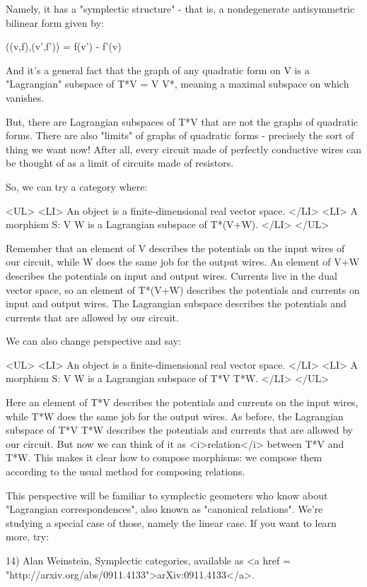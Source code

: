 Namely, it has a "symplectic structure" - that is, a nondegenerate
antisymmetric bilinear form \omega  given by:

\omega ((v,f),(v',f')) = f(v') - f'(v)

And it's a general fact that the graph of any quadratic form on V is a
"Lagrangian" subspace of T*V = V \times  V*, meaning a
maximal subspace on which \omega  vanishes.

But, there are Lagrangian subspaces of T*V that are not the graphs of
quadratic forms.  There are also "limits" of graphs of quadratic
forms - precisely the sort of thing we want now!  After all, every
circuit made of perfectly conductive wires can be thought of as a 
limit of circuits made of resistors.

So, we can try a category where:

<UL>
<LI>
  An object is a finite-dimensional real vector space.  
</LI>
<LI>
  A morphism S: V \to  W is a Lagrangian subspace of T*(V+W).
</LI>
</UL>

Remember that an element of V describes the potentials on the input
wires of our circuit, while W does the same job for the output wires.
An element of V+W describes the potentials on input and output wires.
Currents live in the dual vector space, so an element of T*(V+W)
describes the potentials and currents on input and output wires.  The
Lagrangian subspace describes the potentials and currents that are
allowed by our circuit.

We can also change perspective and say:

<UL>
<LI>
  An object is a finite-dimensional real vector space.  
</LI>
<LI>
  A morphism S: V \to  W is a Lagrangian subspace of T*V \times  T*W.
</LI>
</UL>

Here an element of T*V describes the potentials and currents on the
input wires, while T*W does the same job for the output wires.  As
before, the Lagrangian subspace of T*V \times  T*W describes the potentials
and currents that are allowed by our circuit.  But now we can think of
it as <i>relation</i> between T*V and T*W.  This makes it clear how to
compose morphisms: we compose them according to the usual method for 
composing relations.

This perspective will be familiar to symplectic geometers who know
about "Lagrangian correspondences", also known as
"canonical relations".  We're studying a special case of
those, namely the linear case.  If you want to learn more, try:

14) Alan Weinstein, Symplectic categories, available as
<a href = "http://arxiv.org/abs/0911.4133">arXiv:0911.4133</a>.

